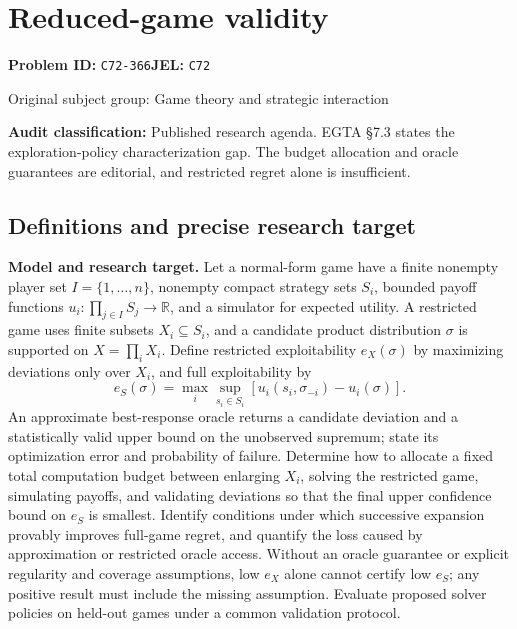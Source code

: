 \documentclass[11pt,a4paper]{article}
\newcommand{\R}{\mathbb R}
\begin{document}
\section*{Reduced-game validity}
\textbf{Problem ID:} \texttt{C72-366}\quad \textbf{JEL:} \texttt{C72}\par
\label{problem:OP-0289}
{\sffamily\small\color{muted}Original subject group: Game theory and strategic interaction\par}
\label{definitions:problem:30007571}
\textbf{Audit classification:} Published research agenda. EGTA §7.3 states the exploration-policy characterization gap. The budget allocation and oracle guarantees are editorial, and restricted regret alone is insufficient.
\subsection*{Definitions and precise research target}
\textbf{Model and research target.} Let a normal-form game have a finite nonempty player set \(I=\{1,\ldots,n\}\), nonempty compact strategy sets \(S_i\), bounded payoff functions \(u_i:\prod_{j\in I}S_j\to\R\), and a simulator for expected utility. A restricted game uses finite subsets \(X_i\subseteq S_i\), and a candidate product distribution \(\sigma\) is supported on \(X=\prod_iX_i\). Define restricted exploitability \(e_X(\sigma)\) by maximizing deviations only over \(X_i\), and full exploitability by
\[
 e_S(\sigma)=\max_i\sup_{s_i\in S_i}
 [u_i(s_i,\sigma_{-i})-u_i(\sigma)].
\]
An approximate best-response oracle returns a candidate deviation and a statistically valid upper bound on the unobserved supremum; state its optimization error and probability of failure. Determine how to allocate a fixed total computation budget between enlarging \(X_i\), solving the restricted game, simulating payoffs, and validating deviations so that the final upper confidence bound on \(e_S\) is smallest. Identify conditions under which successive expansion provably improves full-game regret, and quantify the loss caused by approximation or restricted oracle access. Without an oracle guarantee or explicit regularity and coverage assumptions, low \(e_X\) alone cannot certify low \(e_S\); any positive result must include the missing assumption. Evaluate proposed solver policies on held-out games under a common validation protocol.
\end{document}
